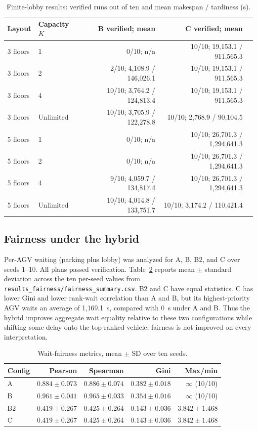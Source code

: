 \documentclass[11pt]{article}
\begin{document}
\begin{table}[htbp]
\centering
\scriptsize
\caption{Finite-lobby results: verified runs out of ten and mean makespan / tardiness (s).}
\label{tab:lobby-cap}
\begin{tabular}{llrrr}
\toprule
Layout & Capacity $K$ & B verified; mean & C verified; mean \\
\midrule
3 floors & 1 & 0/10; n/a & 10/10; 19,153.1 / 911,565.3 \\
3 floors & 2 & 2/10; 4,108.9 / 146,026.1 & 10/10; 19,153.1 / 911,565.3 \\
3 floors & 4 & 10/10; 3,764.2 / 124,813.4 & 10/10; 19,153.1 / 911,565.3 \\
3 floors & Unlimited & 10/10; 3,705.9 / 122,278.8 & 10/10; 2,768.9 / 90,104.5 \\
5 floors & 1 & 0/10; n/a & 10/10; 26,701.3 / 1,294,641.3 \\
5 floors & 2 & 0/10; n/a & 10/10; 26,701.3 / 1,294,641.3 \\
5 floors & 4 & 9/10; 4,059.7 / 134,817.4 & 10/10; 26,701.3 / 1,294,641.3 \\
5 floors & Unlimited & 10/10; 4,014.8 / 133,751.7 & 10/10; 3,174.2 / 110,421.4 \\
\bottomrule
\end{tabular}
\end{table}

\subsection{Fairness under the hybrid}

Per-AGV waiting (parking plus lobby) was analyzed for A, B, B2, and C over
seeds 1--10. All plans passed verification. Table~\ref{tab:fairness} reports
mean $\pm$ standard deviation across the ten per-seed values from
\texttt{results\_fairness/fairness\_summary.csv}. B2 and C have equal
statistics. C has lower Gini and lower rank-wait correlation than A and B,
but its highest-priority AGV waits an average of 1,169.1~s, compared with
0~s under A and B. Thus the hybrid improves aggregate wait equality relative
to these two configurations while shifting some delay onto the top-ranked
vehicle; fairness is not improved on every interpretation.

\begin{table}[htbp]
\centering
\small
\caption{Wait-fairness metrics, mean $\pm$ SD over ten seeds.}
\label{tab:fairness}
\begin{tabular}{lrrrr}
\toprule
Config & Pearson & Spearman & Gini & Max/min \\
\midrule
A & $0.884\pm0.073$ & $0.886\pm0.074$ & $0.382\pm0.018$ & $\infty$ (10/10) \\
B & $0.961\pm0.041$ & $0.965\pm0.033$ & $0.354\pm0.016$ & $\infty$ (10/10) \\
B2 & $0.419\pm0.267$ & $0.425\pm0.264$ & $0.143\pm0.036$ & $3.842\pm1.468$ \\
C & $0.419\pm0.267$ & $0.425\pm0.264$ & $0.143\pm0.036$ & $3.842\pm1.468$ \\
\bottomrule
\end{tabular}
\end{table}
\end{document}
